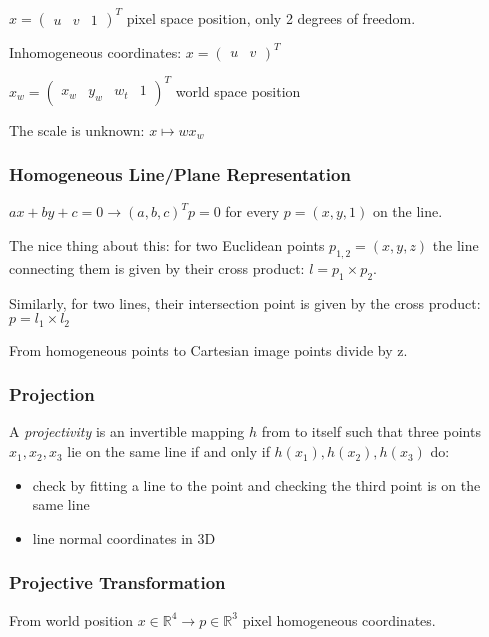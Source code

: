 $x = \left(\begin{matrix} u & v & 1 \end{matrix}\right)^T$ pixel space position, only 2 degrees of freedom.

Inhomogeneous coordinates: $x = (\begin{matrix} u & v \end{matrix})^T $

$ x_w = \left( \begin{matrix} x_w &  y_w & w_t & 1 \end{matrix} \right)^T $ world space position

The scale is unknown: $x \mapsto  w x_w$

\subsubsection{Homogeneous Line/Plane Representation}

$ax+by+c = 0 \to (a,b,c)^T p = 0$ for every $p = (x,y,1)$ on the line.

The nice thing about this: for two Euclidean points $p_{1,2} = (x,y,z) $ the line connecting them is given by their cross product: $l = p_1 \times p_2$. 

Similarly, for two lines, their intersection point is given by the cross product: 
$p = l_1 \times l_2$

From homogeneous points to Cartesian image points divide by z. 


\subsubsection{Projection}

A \emph{projectivity} is an invertible mapping $h$ from  to itself such that three points $x_1 , x_2 , x_3$ lie on the same line if and only if $h(x_1), h(x_2 ), h(x_3)$ do:
%
\begin{itemize}
\item check by fitting a line to the point and checking the third point is on the same line
\item line normal coordinates in 3D
\end{itemize}

\subsubsection{Projective Transformation}

From world position $x \in \mathbb{R}^4 \to p \in \mathbb R^3$ pixel homogeneous coordinates. 

